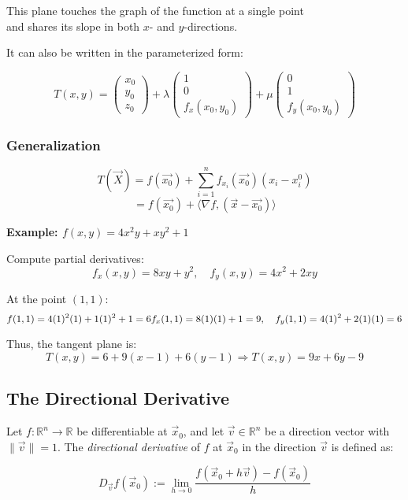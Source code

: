 This plane touches the graph of the function at a single point\\
and shares its slope in both \( x \)- and \( y \)-directions.

It can also be written in the parameterized form:

\[
T(x,y) = \begin{pmatrix} x_0\\ y_0\\ z_0\end{pmatrix} + \lambda 
\begin{pmatrix} 1\\ 0 \\ f_x(x_0,y_0)\end{pmatrix} + \mu \begin{pmatrix}
0 \\ 1 \\ f_y(x_0, y_0)
\end{pmatrix}
\]

\subsubsection{Generalization}
\[
T(\vec{X}) = f(\vec{x_0}) + \sum_{i = 1}^{n} f_{x_i}(\vec{x_0})(x_i - x_{i}^0)
\]
\[
 = f(\vec{x_0}) + \langle \nabla f, (\vec{x} - \vec{x_0})\rangle
\]

\textbf{Example: \( f(x, y) = 4x^2y + xy^2 + 1 \)}

Compute partial derivatives:
\[
f_x(x, y) = 8xy + y^2, \quad f_y(x, y) = 4x^2 + 2xy
\]

At the point \( (1, 1) \):
\[
f(1, 1) = 4(1)^2(1) + 1(1)^2 + 1 = 6 \\
f_x(1, 1) = 8(1)(1) + 1 = 9, \quad f_y(1, 1) = 4(1)^2 + 2(1)(1) = 6
\]

Thus, the tangent plane is:
\[
T(x, y) = 6 + 9(x - 1) + 6(y - 1)
\Rightarrow T(x, y) = 9x + 6y - 9
\]

\subsection{The Directional Derivative}

Let \( f : \mathbb{R}^n \to \mathbb{R} \) be differentiable at \( \vec{x}_0 \), 
and let \( \vec{v} \in \mathbb{R}^n \) be a direction vector with \( \|\vec{v}\| = 1 \). The 
\emph{directional derivative} of \( f \) at \( \vec{x}_0 \) in the direction \( \vec{v} \) is defined as:

\[
D_{\vec{v}}f(\vec{x}_0) := \lim_{h \to 0} \frac{f(\vec{x}_0 + h\vec{v}) - f(\vec{x}_0)}{h}
\]

